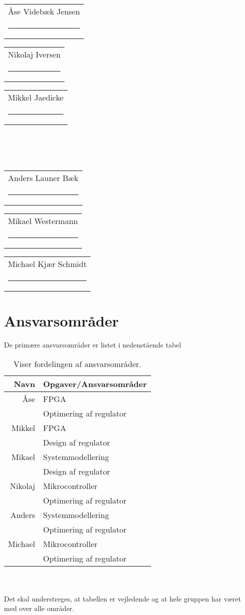 



\vspace{3cm}
{
\newcommand{\namesigdate}[2][5cm]{%
  \begin{tabular}{@{}p{#1}@{}}
    #2 \\[2\normalbaselineskip] \hrule \\[0pt]
  \end{tabular}
}
\begin{changemargin}{-0cm}{-0cm}
\centering
\noindent \namesigdate[4.3cm]{Åse Videbæk Jensen} \hspace{1cm} \namesigdate[4.3cm]{Nikolaj Iversen} \hspace{1cm} \namesigdate[4.3cm]{Mikkel Jaedicke} \\~\\~\\
\centering
\noindent \namesigdate[4.3cm]{Anders Launer Bæk} \hspace{1cm}  \namesigdate[4.3cm]{Mikael Westermann} \hspace{1cm}   \namesigdate[4.3cm]{Michael Kjær Schmidt}
\end{changemargin}
}
\bigskip
\section*{Ansvarsområder}
De primære ansvarsområder er listet i nedenstående tabel
\bigskip
\begin{table}[!th]
\centering
\setlength{\extrarowheight}{5pt}
 \begin{tabular}{r|l}
Navn&Opgaver/Ansvarsområder \\[6pt] \hline
Åse&FPGA\\
& Optimering af regulator\\[6pt] \hline
Mikkel& FPGA\\ 
& Design af regulator\\[6pt] \hline
Mikael& Systemmodellering\\
& Design af regulator\\[6pt] \hline
Nikolaj&Mikrocontroller\\
& Optimering af regulator\\[6pt] \hline
Anders&Systemmodellering\\
& Optimering af regulator\\[6pt] \hline
Michael &Mikrocontroller\\
& Optimering af regulator\\ 
\end{tabular}     
\caption*{Viser fordelingen af ansvarsområder.}            
\end{table}\\~\\ 
Det skal understreges, at tabellen er vejledende og at hele gruppen har været med over alle områder.


